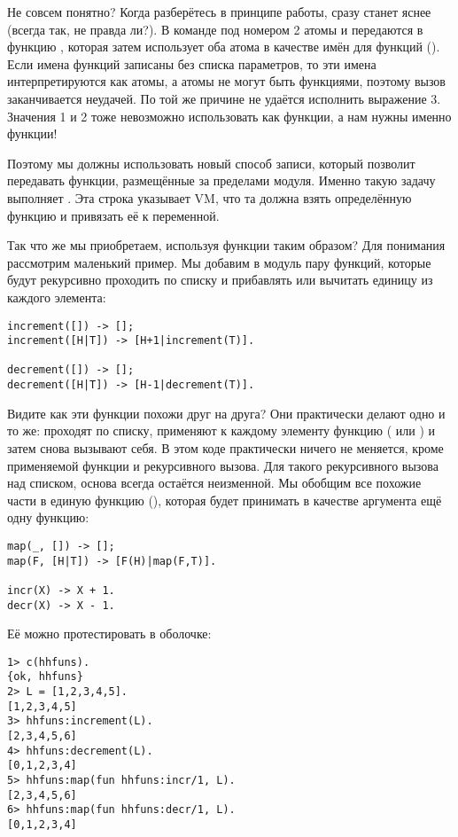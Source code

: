 Не совсем понятно?
Когда разберётесь в принципе работы, сразу станет яснее (всегда так, не правда ли?).
В команде под номером 2 атомы  и  передаются в функцию , которая затем использует оба атома в качестве имён для функций ().
Если имена функций записаны без списка параметров, то эти имена интерпретируются как атомы, а атомы не могут быть функциями, поэтому вызов заканчивается неудачей.
По той же причине не удаётся исполнить выражение 3.
Значения 1 и 2 тоже невозможно использовать как функции, а нам нужны именно функции!

Поэтому мы должны использовать новый способ записи, который позволит передавать функции, размещённые за пределами модуля.
Именно такую задачу выполняет .
Эта строка указывает VM, что та должна взять определённую функцию и привязать её к переменной.

Так что же мы приобретаем, используя функции таким образом?
Для понимания рассмотрим маленький пример.
Мы добавим в модуль  пару функций, которые будут рекурсивно проходить по списку и прибавлять или вычитать единицу из каждого элемента:
\begin{lstlisting}[style=erlang]
increment([]) -> [];
increment([H|T]) -> [H+1|increment(T)].
 
decrement([]) -> [];
decrement([H|T]) -> [H-1|decrement(T)].
\end{lstlisting}

Видите как эти функции похожи друг на друга?
Они практически делают одно и то же: проходят по списку, применяют к каждому элементу функцию (\ops{+\strut} или \ops{-\strut}) и затем снова вызывают себя.
В этом коде практически ничего не меняется, кроме применяемой функции и рекурсивного вызова.
Для такого рекурсивного вызова над списком, основа всегда остаётся неизменной.
Мы обобщим все похожие части в единую функцию (), которая будет принимать в качестве аргумента ещё одну функцию:
\begin{lstlisting}[style=erlang]
map(_, []) -> [];
map(F, [H|T]) -> [F(H)|map(F,T)].
 
incr(X) -> X + 1.
decr(X) -> X - 1.
\end{lstlisting}

Её можно протестировать в оболочке:
\begin{lstlisting}[style=erlang]
1> c(hhfuns).
{ok, hhfuns}
2> L = [1,2,3,4,5].
[1,2,3,4,5]
3> hhfuns:increment(L).
[2,3,4,5,6]
4> hhfuns:decrement(L).
[0,1,2,3,4]
5> hhfuns:map(fun hhfuns:incr/1, L).
[2,3,4,5,6]
6> hhfuns:map(fun hhfuns:decr/1, L).
[0,1,2,3,4]
\end{lstlisting}


